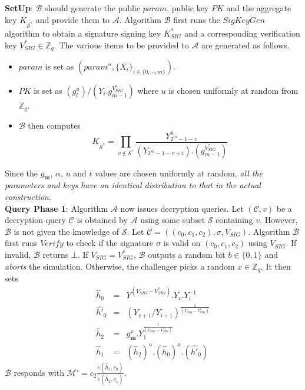 \noindent \textbf{SetUp}: $\mathcal{B}$ should generate the public $param$, public key $PK$ and the aggregate key $K_{\overline{{\mathcal{S}}^{*}}}$ and provide them to $\mathcal{A}$. Algorithm $\mathcal{B}$ first runs the $SigKeyGen$ algorithm to obtain a signature signing key $K^{*}_{SIG}$ and a corresponding verification key $V^{*}_{SIG} \in \mathbb{Z}_q$. The various items to be provided to $\mathcal{A}$ are generated as follows.
\begin{itemize}
  \item $param$ is set as $(param'',\{X_i\}_{i\in\{0,\cdots,m\}})\nonumber$.
  \item $PK$ is set as $\left({g^u_{l}}\right)/{\left(Y_i.g^{V^{*}_{SIG}}_{m-1}\right)}$ where $u$ is chosen uniformly at random from $\mathbb{Z}_q$.
  \item $\mathcal{B}$ then computes   
  \begin{equation}
   K_{\overline{{\mathcal{S}}^{*}}} = \prod_{v\notin{\mathcal{S}}^{*}}\frac{Y^{u}_{2^m-1-v}}{(Y_{2^m-1-v+i}).(g^{V^{*}_{SIG}}_{m-1})}\nonumber
  \end{equation}
  
\end{itemize}
 
\noindent Since the $g_{\mathbf{m}}$, $\alpha$, $u$ and $t$ values are chosen uniformly at random, \emph{all the parameters and keys have an identical distribution to that in the actual construction}.\\

\noindent\textbf{Query Phase 1}: Algorithm $\mathcal{A}$ now issues decryption queries. Let $(\mathcal{C},v)$ be a decryption query $\mathcal{C}$ is obtained by $\mathcal{A}$ using some subset $\mathcal{S}$ containing $v$. However, $\mathcal{B}$ is not given the knowledge of $\mathcal{S}$. Let $\mathcal{C}=((c_0,c_1,c_2),\sigma,V_{SIG})$. Algorithm $\mathcal{B}$ first runs $Verify$ to check if the signature $\sigma$ is valid on $(c_0,c_1,c_2)$ using $V_{SIG}$. If invalid, $\mathcal{B}$ returns $\bot$. If $V_{SIG} = V^{*}_{SIG}$, $\mathcal{B}$ outputs a random bit $b\in\{0,1\}$ and \emph{aborts} the simulation. Otherwise, the challenger picks a random $x\in\mathbb{Z}_q$. It then sets
\begin{eqnarray}
 \hat{h}_0&=&Y^{(V_{SIG}-V^{*}_{SIG})}.Y_v.Y^{-1}_i\nonumber\\
 \hat{h'}_0&=&(Y_{v+1}/Y_{i+1})^{\frac{1}{(V_{SIG}-V^{*}_{SIG})}}\nonumber \\
 \hat{h}_2&=&g^{x}_{\mathbf{m}}.Y^{\frac{1}{(V_{SIG}-V^{*}_{SIG})}}_1\nonumber\\
 \hat{h}_1&=&\left(\hat{h}_2\right)^u.\left(\hat{h}_0\right)^x.\left(\hat{h'}_0\right) \nonumber 
\end{eqnarray}
\noindent $\mathcal{B}$ responds with $\mathcal{M}'=c_2\frac{{e}(\hat{h}_1,c_0)}{{e}(\hat{h}_2,c_1)}$. 

